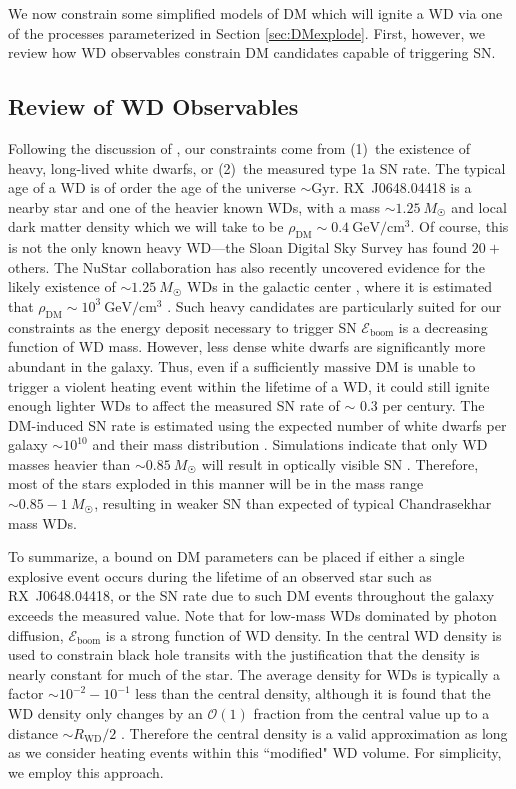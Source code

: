 \documentclass[twocolumn, preprintnumbers,amsmath,amssymb,prd, superscriptaddress]{revtex4}
\newcommand{\Eboom}{\mathcal{E}_\text{boom}}
\newcommand{\OO}{\mathcal{O}}
\newcommand{\GeV}{\text{GeV}}
\begin{document}
We now constrain some simplified models of DM which will ignite a WD via one of the processes parameterized in Section \ref{sec:DMexplode}.
First, however, we review how WD observables constrain DM candidates capable of triggering SN.

\subsection{Review of WD Observables}
Following the discussion of \cite{Graham:2015apa}, our constraints come from (1)~the existence of heavy, long-lived white dwarfs, or (2)~the measured type 1a SN rate.
The typical age of a WD is of order the age of the universe $\sim \text{Gyr}$.
RX~J0648.04418 is a nearby star and one of the heavier known WDs, with a mass $\sim 1.25 ~M_{\astrosun}$ \cite{Mereghetti:2013nba} and local dark matter density which we will take to be $\rho_\text{DM} \sim 0.4 ~\GeV/\text{cm}^3$.
Of course, this is not the only known heavy WD---the Sloan Digital Sky Survey \cite{SDSS} has found $20+$ others.
The NuStar collaboration has also recently uncovered evidence for the likely existence of $\sim 1.25 ~M_{\astrosun}$ WDs in the galactic center \cite{NuStar}, where it is estimated that $\rho_\text{DM} \sim 10^3 ~\text{GeV}/\text{cm}^3$ \cite{Nesti:2013uwa}.
Such heavy candidates are particularly suited for our constraints as the energy deposit necessary to trigger SN $\Eboom$ is a decreasing function of WD mass.
However, less dense white dwarfs are significantly more abundant in the galaxy.
Thus, even if a sufficiently massive DM is unable to trigger a violent heating event within the lifetime of a WD, it could still ignite enough lighter WDs to affect the measured SN rate of $\sim $ 0.3 per century.
The DM-induced SN rate is estimated using the expected number of white dwarfs per galaxy $\sim 10^{10}$ and their mass distribution \cite{SDSS}.
Simulations indicate that only WD masses heavier than $\sim 0.85 ~M_{\astrosun}$ will result in optically visible SN \cite{Graham:2015apa}.
Therefore, most of the stars exploded in this manner will be in the mass range $\sim 0.85 - 1 ~M_{\astrosun}$, resulting in weaker SN than expected of typical Chandrasekhar mass WDs.

To summarize, a bound on DM parameters can be placed if either a single explosive event occurs during the lifetime of an observed star such as RX~J0648.04418, or the SN rate due to such DM events throughout the galaxy exceeds the measured value.
Note that for low-mass WDs dominated by photon diffusion, $\Eboom$ is a strong function of WD density.
In \cite{Graham:2015apa} the central WD density is used to constrain black hole transits with the justification that the density is nearly constant for much of the star.
The average density for WDs is typically a factor $\sim 10^{-2} - 10^{-1}$ less than the central density, although it is found that the WD density only changes by an $\OO(1)$ fraction from the central value up to a distance $\sim R_\text{WD}/2$ \cite{Chandrasekhar}.
Therefore the central density is a valid approximation as long as we consider heating events within this ``modified" WD volume.
For simplicity, we employ this approach.
\end{document}
